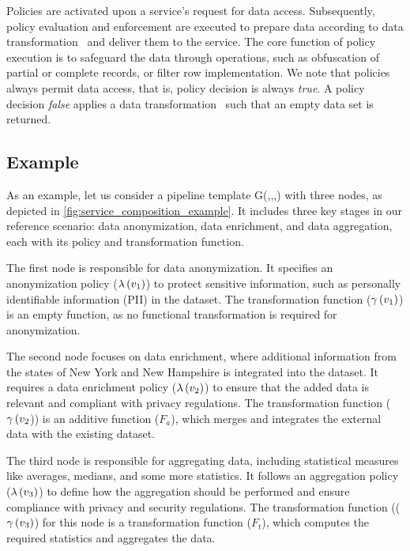 Policies are activated upon a service's request for data access. Subsequently, policy evaluation and enforcement are executed to prepare data according to data transformation \TF\ and deliver them to the service. The core function of policy execution is to safeguard the data through operations, such as obfuscation of partial or complete records, or filter row implementation. We note that policies always permit data access, that is, policy decision is always \emph{true}. A policy decision \emph{false} applies a data transformation \TF\ such that an empty data set is returned.

\subsection{Example}\label{sec:example}
As an example, let us consider a pipeline template G(\V,\E,\myLambda,\myGamma) with three nodes, as depicted in \cref{fig:service_composition_example}.
It includes three key stages in our reference scenario: data anonymization, data enrichment, and data aggregation, each with its policy and transformation function.

\begin{enumerate*}[label=n\arabic*)]
  \item The first node is responsible for data anonymization.
        It specifies an anonymization policy ($\lambda\,(v_1)$) to protect sensitive information, such as personally identifiable information (PII) in the dataset.
        The transformation function ($\gamma\,(v_1)$) is an empty function, as no functional transformation is required for anonymization.
  \item The second node focuses on data enrichment, where additional information from the states of New York and New Hampshire is integrated into the dataset.
        It requires a data enrichment policy ($\lambda\,(v_2)$) to ensure that the added data is relevant and compliant with privacy regulations.
        The transformation function ($\gamma\,(v_2$)) is an additive function ($F_a$), which merges and integrates the external data with the existing dataset.
  \item The third node is responsible for aggregating data, including statistical measures like averages, medians, and some more statistics. It follows an aggregation policy ($\lambda\,(v_3)$) to define how the aggregation should be performed and ensure compliance with privacy and security regulations.
        The transformation function (($\gamma\,(v_3)$) for this node is a transformation function ($F_t$), which computes the required statistics and aggregates the data.
\end{enumerate*}

